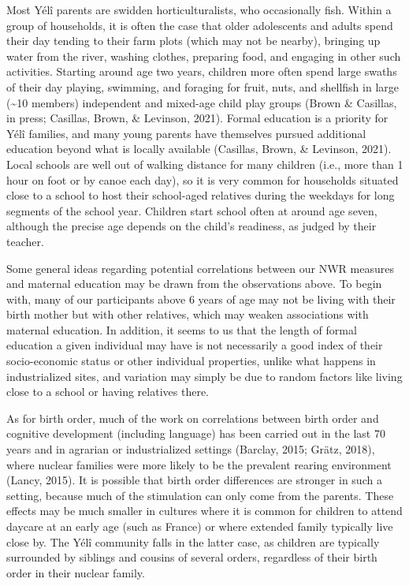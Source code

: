 \documentclass[
  american,
  ,man,floatsintext]{apa6}
\begin{document}
Most Yélî parents are swidden horticulturalists, who occasionally fish. Within a group of households, it is often the case that older adolescents and adults spend their day tending to their farm plots (which may not be nearby), bringing up water from the river, washing clothes, preparing food, and engaging in other such activities. Starting around age two years, children more often spend large swaths of their day playing, swimming, and foraging for fruit, nuts, and shellfish in large (\textasciitilde10 members) independent and mixed-age child play groups (Brown \& Casillas, in press; Casillas, Brown, \& Levinson, 2021). Formal education is a priority for Yélî families, and many young parents have themselves pursued additional education beyond what is locally available (Casillas, Brown, \& Levinson, 2021). Local schools are well out of walking distance for many children (i.e., more than 1 hour on foot or by canoe each day), so it is very common for households situated close to a school to host their school-aged relatives during the weekdays for long segments of the school year. Children start school often at around age seven, although the precise age depends on the child's readiness, as judged by their teacher.

Some general ideas regarding potential correlations between our NWR measures and maternal education may be drawn from the observations above. To begin with, many of our participants above 6 years of age may not be living with their birth mother but with other relatives, which may weaken associations with maternal education.
In addition, it seems to us that the length of formal education a given individual may have is not necessarily a good index of their socio-economic status or other individual properties, unlike what happens in industrialized sites, and variation may simply be due to random factors like living close to a school or having relatives there.

As for birth order, much of the work on correlations between birth order and cognitive development (including language) has been carried out in the last 70 years and in agrarian or industrialized settings (Barclay, 2015; Grätz, 2018), where nuclear families were more likely to be the prevalent rearing environment (Lancy, 2015). It is possible that birth order differences are stronger in such a setting, because much of the stimulation can only come from the parents. These effects may be much smaller in cultures where it is common for children to attend daycare at an early age (such as France) or where extended family typically live close by. The Yélî community falls in the latter case, as children are typically surrounded by siblings and cousins of several orders, regardless of their birth order in their nuclear family.
\end{document}
